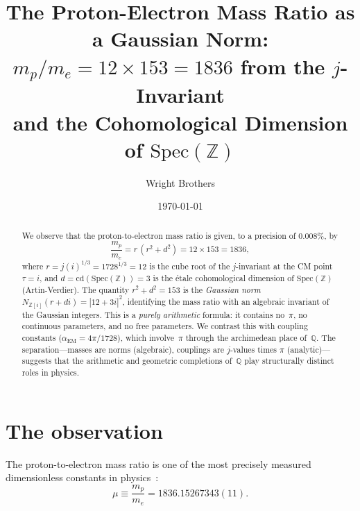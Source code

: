 \documentclass[aps,prl,twocolumn,superscriptaddress,nofootinbib]{revtex4-2}
\newcommand{\Z}{\mathbb{Z}}
\newcommand{\Q}{\mathbb{Q}}
\newcommand{\Spec}{\mathrm{Spec}}
\newcommand{\cd}{\mathrm{cd}}
\begin{document}
\title{The Proton-Electron Mass Ratio as a Gaussian Norm:\\
$m_p/m_e = 12 \times 153 = 1836$ from the $j$-Invariant\\
and the Cohomological Dimension of $\Spec(\Z)$}

\author{Wright Brothers}
\date{\today}

\begin{abstract}
We observe that the proton-to-electron mass ratio is given,
to a precision of 0.008\%, by
\begin{equation*}
  \frac{m_p}{m_e} = r \,(r^2 + d^2) = 12 \times 153 = 1836,
\end{equation*}
where $r = j(i)^{1/3} = 1728^{1/3} = 12$ is the cube root
of the $j$-invariant at the CM point $\tau = i$,
and $d = \cd(\Spec(\Z)) = 3$ is the \'etale cohomological
dimension of $\Spec(\Z)$ (Artin-Verdier).
The quantity $r^2 + d^2 = 153$ is the \emph{Gaussian norm}
$N_{\Z[i]}(r + di) = |12 + 3i|^2$,
identifying the mass ratio with an algebraic invariant
of the Gaussian integers.
This is a \emph{purely arithmetic} formula:
it contains no~$\pi$, no continuous parameters, and no free
parameters.
We contrast this with coupling constants ($\alpha_{\mathrm{EM}}
= 4\pi/1728$), which involve~$\pi$ through the archimedean
place of~$\Q$.
The separation---masses are norms (algebraic),
couplings are $j$-values times $\pi$ (analytic)---suggests
that the arithmetic and geometric completions of~$\Q$
play structurally distinct roles in physics.
\end{abstract}

\maketitle

\section{The observation}

The proton-to-electron mass ratio is one of the most precisely
measured dimensionless constants in
physics~\cite{CODATA2018,Tiesinga2021}:
\begin{equation}
  \mu \equiv \frac{m_p}{m_e} = 1836.15267343(11).
  \label{eq:obs}
\end{equation}
\end{document}
